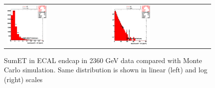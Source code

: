 \begin{figure}[h!]
 \centering
 \begin{tabular}{ll}
  \includegraphics[width=0.40\textwidth]{plots_DataVsMC_MB_2360GeV/h_caloSumetEE_lin.eps} &
  \includegraphics[width=0.40\textwidth]{plots_DataVsMC_MB_2360GeV/h_caloSumetEE.eps} \\
 \end{tabular}
\caption{SumET in ECAL endcap in 2360 GeV data compared
   with Monte Carlo simulation. Same distribution is shown in linear (left) and log (right) scales
         \label{fig:DataVsMC_MB_2360_6}}
\end{figure}

